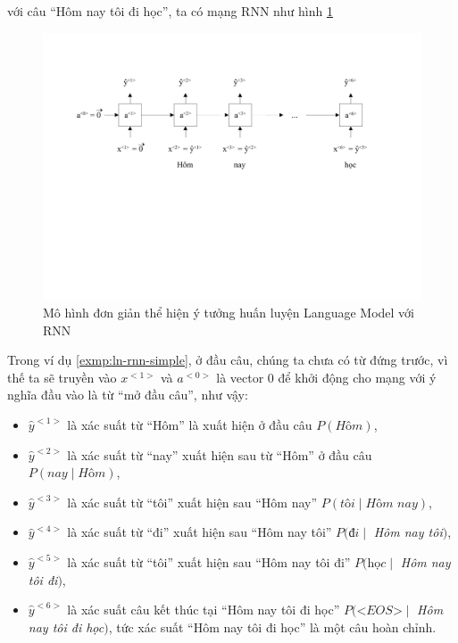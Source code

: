 \begin{exmp}
\label{exmp:ln-rnn-simple}
với câu “Hôm nay tôi đi học”, ta có mạng RNN như hình \ref{fig:lm-rnn-simple}
\begin{figure}[h!]
    \centering
    \includegraphics[width=13cm]{chapter07/figure-sec12/lm-rnn-simple.pdf}
    \caption{Mô hình đơn giản thể hiện ý tưởng huấn luyện Language Model với RNN}
    \label{fig:lm-rnn-simple}
\end{figure}
\end{exmp}
Trong ví dụ \ref{exmp:ln-rnn-simple}, ở đầu câu, chúng ta chưa có từ đứng trước, vì thế ta sẽ truyền vào $x^{<1>}$ và $a^{<0>}$ là vector 0 để khởi động cho mạng với ý nghĩa đầu vào là từ “mở đầu câu”, như vậy:

\begin{itemize}
\item $\hat{y}^{<1>}$ là xác suất từ “Hôm” là xuất hiện ở đầu câu $P(\textit{Hôm})$,
\item $\hat{y}^{<2>}$ là xác suất từ “nay” xuất hiện sau từ “Hôm” ở đầu câu $P(\textit{nay} \mid \textit{Hôm})$,
\item $\hat{y}^{<3>}$ là xác suất từ “tôi” xuất hiện sau “Hôm nay” $P(\textit{tôi} \mid \textit{Hôm nay})$,
\item $\hat{y}^{<4>}$ là xác suất từ “đi” xuất hiện sau “Hôm nay tôi” $P(\textit{đi} \mid$ \textit{Hôm nay tôi}$)$,
\item $\hat{y}^{<5>}$ là xác suất từ “tôi” xuất hiện sau “Hôm nay tôi đi” $P(\textit{học} \mid$ \textit{Hôm nay tôi đi}$)$,
\item $\hat{y}^{<6>}$ là xác suất câu kết thúc tại “Hôm nay tôi đi học” $P(\textit{<EOS>} \mid$ \textit{Hôm nay tôi đi học}$)$, tức xác suất “Hôm nay tôi đi học” là một câu hoàn chỉnh.
\end{itemize}

